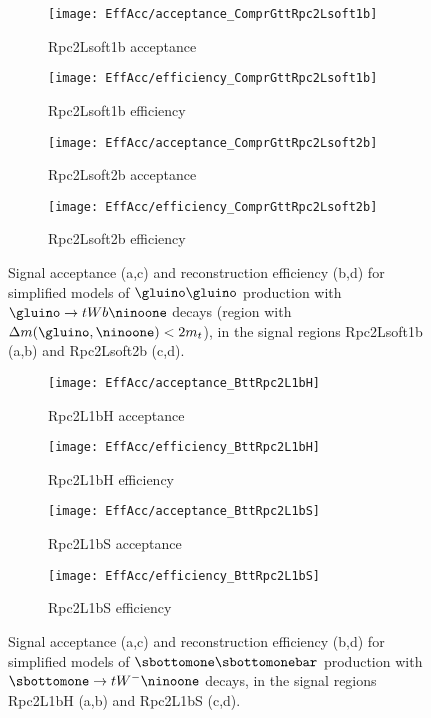 \begin{figure}[htb!]
\centering
\begin{subfigure}[t]{0.49\textwidth}\texttt{[image: EffAcc/acceptance\_ComprGttRpc2Lsoft1b]}\caption{Rpc2Lsoft1b acceptance}\end{subfigure}
\begin{subfigure}[t]{0.49\textwidth}\texttt{[image: EffAcc/efficiency\_ComprGttRpc2Lsoft1b]}\caption{Rpc2Lsoft1b efficiency}\end{subfigure}
\begin{subfigure}[t]{0.49\textwidth}\texttt{[image: EffAcc/acceptance\_ComprGttRpc2Lsoft2b]}\caption{Rpc2Lsoft2b acceptance}\end{subfigure}
\begin{subfigure}[t]{0.49\textwidth}\texttt{[image: EffAcc/efficiency\_ComprGttRpc2Lsoft2b]}\caption{Rpc2Lsoft2b efficiency}\end{subfigure}
\caption{Signal acceptance (a,c) and reconstruction efficiency (b,d) 
for simplified models of $\gluino\gluino$ production with $\gluino\to tWb\ninoone$ decays (region with $\Delta m(\gluino,\ninoone)<2m_t$), 
in the signal regions Rpc2Lsoft1b (a,b) and Rpc2Lsoft2b (c,d).}
\end{figure}

\begin{figure}[htb!]
\centering
\begin{subfigure}[t]{0.49\textwidth}\texttt{[image: EffAcc/acceptance\_BttRpc2L1bH]}\caption{Rpc2L1bH acceptance}\end{subfigure}
\begin{subfigure}[t]{0.49\textwidth}\texttt{[image: EffAcc/efficiency\_BttRpc2L1bH]}\caption{Rpc2L1bH efficiency}\end{subfigure}
\begin{subfigure}[t]{0.49\textwidth}\texttt{[image: EffAcc/acceptance\_BttRpc2L1bS]}\caption{Rpc2L1bS acceptance}\end{subfigure}
\begin{subfigure}[t]{0.49\textwidth}\texttt{[image: EffAcc/efficiency\_BttRpc2L1bS]}\caption{Rpc2L1bS efficiency}\end{subfigure}
\caption{Signal acceptance (a,c) and reconstruction efficiency (b,d) 
for simplified models of $\sbottomone\sbottomonebar$ production with $\sbottomone\to tW^{-}\ninoone$ decays, 
in the signal regions Rpc2L1bH (a,b) and Rpc2L1bS (c,d).}
\end{figure}


